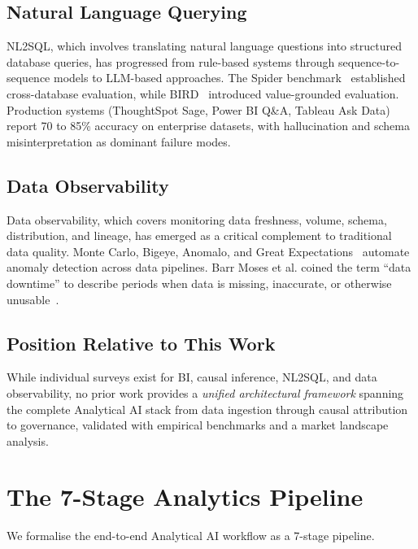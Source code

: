 \documentclass[12pt, a4paper]{article}
\begin{document}
\subsection{Natural Language Querying}
NL2SQL, which involves translating natural language questions into structured database queries, has progressed from rule-based systems through sequence-to-sequence models to LLM-based approaches. The Spider benchmark~\citep{yu2018spider} established cross-database evaluation, while BIRD~\citep{li2024bird} introduced value-grounded evaluation. Production systems (ThoughtSpot Sage, Power BI Q\&A, Tableau Ask Data) report 70 to 85\% accuracy on enterprise datasets, with hallucination and schema misinterpretation as dominant failure modes.

\subsection{Data Observability}
Data observability, which covers monitoring data freshness, volume, schema, distribution, and lineage, has emerged as a critical complement to traditional data quality. Monte Carlo, Bigeye, Anomalo, and Great Expectations~\citep{greatexpectations2023} automate anomaly detection across data pipelines. Barr Moses et al. coined the term ``data downtime'' to describe periods when data is missing, inaccurate, or otherwise unusable~\citep{moses2022data}.

\subsection{Position Relative to This Work}
While individual surveys exist for BI, causal inference, NL2SQL, and data observability, no prior work provides a \emph{unified architectural framework} spanning the complete Analytical AI stack from data ingestion through causal attribution to governance, validated with empirical benchmarks and a market landscape analysis.

\section{The 7-Stage Analytics Pipeline}\label{sec:pipeline}

We formalise the end-to-end Analytical AI workflow as a 7-stage pipeline.
\end{document}
